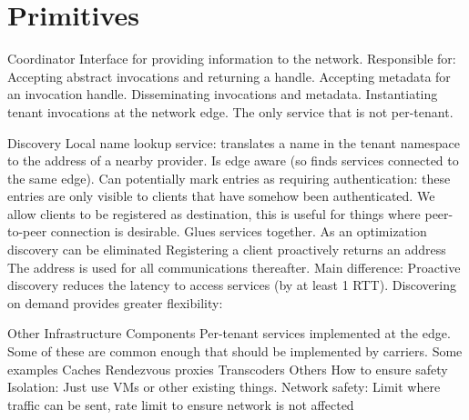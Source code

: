 \section{Primitives}
\label{sec:primitive}


\begin{outline}
\1 Coordinator
    \2 Interface for providing information to the network.
    \2 Responsible for:
        \3 Accepting abstract invocations and returning a handle.
        \3 Accepting metadata for an invocation handle.
        \3 Disseminating invocations and metadata.
        \3 Instantiating tenant invocations at the network edge.
    \2 The only service that is not per-tenant. 

\1 Discovery
    \2 Local name lookup service: translates a name in the tenant namespace to the address of a nearby provider.
    \2 Is edge aware (so finds services connected to the same edge).
    \2 Can potentially mark entries as requiring authentication: these entries are only visible to clients that have somehow been authenticated.
    \2 We allow clients to be registered as destination, this is useful for things where peer-to-peer connection is desirable.
    \2 Glues services together.
    \2 As an optimization discovery can be eliminated
        \3 Registering a client proactively returns an address
        \3 The address is used for all communications thereafter.
        \3 Main difference:
            \4 Proactive discovery reduces the latency to access services (by at least 1 RTT). 
            \4 Discovering on demand provides greater flexibility: 

\1 Other Infrastructure Components
    \2 Per-tenant services implemented at the edge.
    \2 Some of these are common enough that should be implemented by carriers.
    \2 Some examples
        \3 Caches
        \3 Rendezvous proxies
        \3 Transcoders
        \3 Others
    \2 How to ensure safety
        \3 Isolation: Just use VMs or other existing things.
        \3 Network safety: Limit where traffic can be sent, rate limit to ensure network is not affected


\end{outline}
